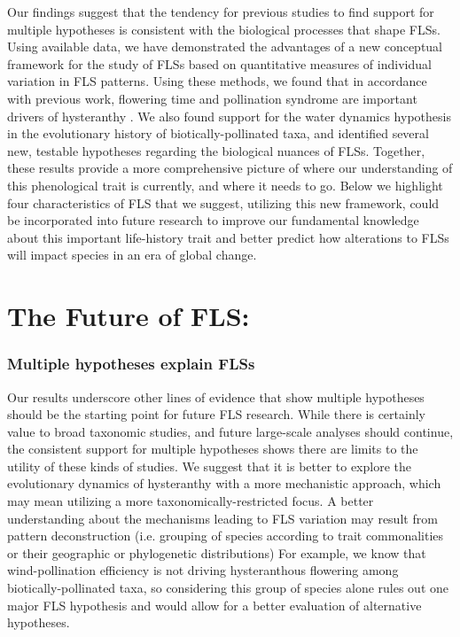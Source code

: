 \documentclass{article}
\begin{document}

\noindent Our findings suggest that the tendency for previous studies to find support for multiple hypotheses \citep{Bolmgren2003,Gougherty2018,Savage2019} is consistent with the biological processes that shape FLSs. Using available data, we have demonstrated the advantages of a new conceptual framework for the study of FLSs based on quantitative measures of individual variation in FLS patterns. Using these methods, we found that in accordance with previous work, flowering time and pollination syndrome are important drivers of hysteranthy \citep{Gougherty2018}. We also found support for the water dynamics hypothesis in the evolutionary history of biotically-pollinated taxa, and identified several new, testable hypotheses regarding the biological nuances of FLSs. Together, these results provide a more comprehensive picture of where our understanding of this phenological trait is currently, and where it needs to go. Below we highlight four characteristics of FLS that we suggest, utilizing this new framework, could be incorporated into future research to improve our fundamental knowledge about this important life-history trait and better predict how alterations to FLSs will impact species in an era of global change.\\
\section*{The Future of FLS:}
\subsubsection*{Multiple hypotheses explain FLSs}
\noindent Our results underscore other lines of evidence that show multiple hypotheses should be the starting point for future FLS research. While there is certainly value to broad taxonomic studies, and future large-scale analyses should continue, the consistent support for multiple hypotheses shows there are limits to the utility of these kinds of studies. We suggest that it is better to explore the evolutionary dynamics of hysteranthy with a more mechanistic approach, which may mean utilizing a more taxonomically-restricted focus. A better understanding about the mechanisms leading to FLS variation may result from pattern deconstruction (i.e. grouping of species according to trait commonalities or their geographic or phylogenetic distributions) \citep{Terribile2009} For example, we know that wind-pollination efficiency is not driving hysteranthous flowering among biotically-pollinated taxa, so considering this group of species alone rules out one major FLS hypothesis and would allow for a better evaluation of alternative hypotheses.\\ 
\end{document}
